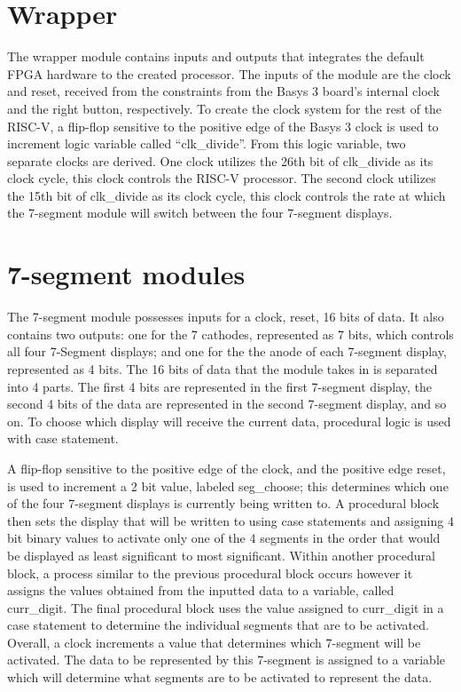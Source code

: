 \documentclass{article}
\begin{document}
\section{Wrapper}
The wrapper module contains inputs and outputs that integrates the default FPGA hardware to the created processor. The inputs of the module are the clock and reset, received from the constraints from the Basys 3 board's internal clock and the right button, respectively. To create the clock system for the rest of the RISC-V, a flip-flop sensitive to the positive edge of the Basys 3 clock is used to increment logic variable called ``clk\_divide''. From this logic variable, two separate clocks are derived. One clock utilizes the 26th bit of clk\_divide as its clock cycle, this clock controls the RISC-V processor. The second clock utilizes the 15th bit of clk\_divide as its clock cycle, this clock controls the rate at which the 7-segment module will switch between the four 7-segment displays.

\section{7-segment modules}

The 7-segment module possesses inputs for a clock, reset, 16 bits of data. It also contains two outputs: one for the 7 cathodes, represented as 7 bits, which controls all four 7-Segment displays; and one for the the anode of each 7-segment display, represented as 4 bits. The 16 bits of data that the module takes in is separated into 4 parts. The first 4 bits are represented in the first 7-segment display, the second 4 bits of the data are represented in the second 7-segment display, and so on. To choose which display will receive the current data, procedural logic is used with case statement.

A flip-flop sensitive to the positive edge of the clock, and the positive edge reset, is used to increment a 2 bit value, labeled seg\_choose; this determines which one of the four 7-segment displays is currently being written to. A procedural block then sets the display that will be written to using case statements and assigning 4 bit binary values to activate only one of the 4 segments in the order that would be displayed as least significant to most significant. Within another procedural block, a process similar to the previous procedural block occurs however it assigns the values obtained from the inputted data to a variable, called curr\_digit. The final procedural block uses the value assigned to curr\_digit in a case statement to determine the individual segments that are to be activated. Overall, a clock increments a value that determines which 7-segment will be activated. The data to be represented by this 7-segment is assigned to a variable which will determine what segments are to be activated to represent the data.
\end{document}
